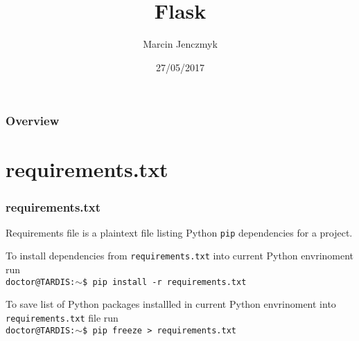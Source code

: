 \documentclass{beamer}
\title[Flask]{Flask} %
\author{Marcin Jenczmyk} %
\institute[Clearcode] %
{
Clearcode \\ %
\medskip
\href{mailto:m.jenczmyk@clearcode.cc}{\nolinkurl{m.jenczmyk@clearcode.cc}} %
}
\date{27/05/2017} %
\newcommand{\bashcmd}[1]{\vspace{1mm}\hspace{5mm}\texttt{#1\\}\vspace{1mm}}
\begin{document}
\begin{frame}
\titlepage %
\end{frame}

\begin{frame}
\frametitle{Overview} %
\tableofcontents %
\end{frame}


\section{requirements.txt}

\begin{frame}
  \frametitle{requirements.txt}

  Requirements file is a plaintext file listing Python \texttt{pip} dependencies for a project.

  \vspace{3mm}

  \pause To install dependencies from \texttt{requirements.txt} into current Python envrinoment run\\
  \bashcmd{doctor@TARDIS:$\sim$\$ pip install -r requirements.txt}

  \vspace{3mm}

  \pause To save list of Python packages installled in current Python envrinoment into \texttt{requirements.txt} file run\\
  \bashcmd{doctor@TARDIS:$\sim$\$ pip freeze > requirements.txt}
\end{frame}
\end{document}
